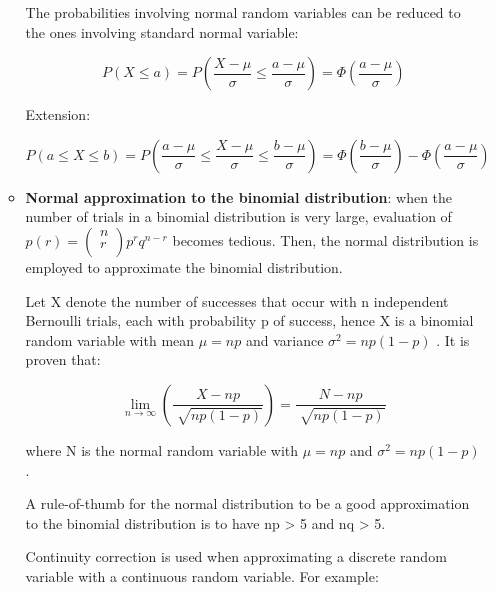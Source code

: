 \documentclass[12pt]{report}
\renewcommand{\_}{\kern-1.5pt\textunderscore\kern-1.5pt}
\begin{document}
\begin{itemize}
\begin{itemize}
The probabilities involving normal random variables can be reduced to the ones involving standard normal variable:\par

 \[ P \left( X \leq a \right) =P \left( \frac{X- \mu }{ \sigma } \leq \frac{a- \mu }{ \sigma } \right) = \Phi  \left( \frac{a- \mu }{ \sigma } \right)  \] \par

Extension:\par

 \[ P \left( a \leq X \leq b \right) =P \left( \frac{a- \mu }{ \sigma } \leq \frac{X- \mu }{ \sigma } \leq \frac{b- \mu }{ \sigma } \right) = \Phi  \left( \frac{b- \mu }{ \sigma } \right) - \Phi  \left( \frac{a- \mu }{ \sigma } \right)  \] \par

	\item \textbf{Normal approximation to the binomial distribution}: when the number of trials in a binomial distribution is very large, evaluation of  \( p \left( r \right) = \left( \begin{matrix}
n\\
r\\
\end{matrix}
 \right) p^{r}q^{n-r} \)  becomes tedious. Then, the normal distribution is employed to approximate the binomial distribution.\par

Let X denote the number of successes that occur with n independent Bernoulli trials, each with probability p of success, hence X is a binomial random variable with mean  \(  \mu =np \)  and variance  \(  \sigma ^{2}=np \left( 1-p \right)  \) . It is proven that:\par

 \[ \mathop{\lim }_{n \rightarrow \infty} \left( \frac{X-np}{\sqrt[]{np \left( 1-p \right) }} \right) =\frac{N-np}{\sqrt[]{np \left( 1-p \right) }} \] \par

where N is the normal random variable with  \(  \mu =np \)  and  \(  \sigma ^{2}=np \left( 1-p \right)  \) .\par

A rule-of-thumb for the normal distribution to be a good approximation to the binomial distribution is to have np > 5 and nq > 5.\par

Continuity correction is used when approximating a discrete random variable with a continuous random variable. For example: \par


\end{itemize}
\end{itemize}
\end{document}
